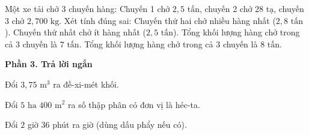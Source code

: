 \begin{ex} %
Một xe tải chở $3$ chuyến hàng: Chuyến 1 chở $2{,}5\text{ tấn}$, chuyến 2 chở $28\text{ tạ}$, chuyến 3 chở $2,700\text{ kg}$. Xét tính đúng sai:
\choiceTF
{\True Chuyến thứ hai chở nhiều hàng nhất ($2{,}8\text{ tấn}$).}
{\True Chuyến thứ nhất chở ít hàng nhất ($2{,}5\text{ tấn}$).}
{Tổng khối lượng hàng chở trong cả 3 chuyến là $7\text{ tấn}$.}
{\True Tổng khối lượng hàng chở trong cả 3 chuyến là $8\text{ tấn}$.}
\end{ex}

\textbf{Phần 3. Trả lời ngắn}

\begin{ex} %
Đổi $3{,}75\text{ m}^3$ ra đề-xi-mét khối.
\end{ex}

\begin{ex} %
Đổi $5\text{ ha } 400\text{ m}^2$ ra số thập phân có đơn vị là héc-ta.
\end{ex}

\begin{ex} %
Đổi $2$ giờ $36$ phút ra giờ (dùng dấu phẩy nếu có).
\end{ex}

